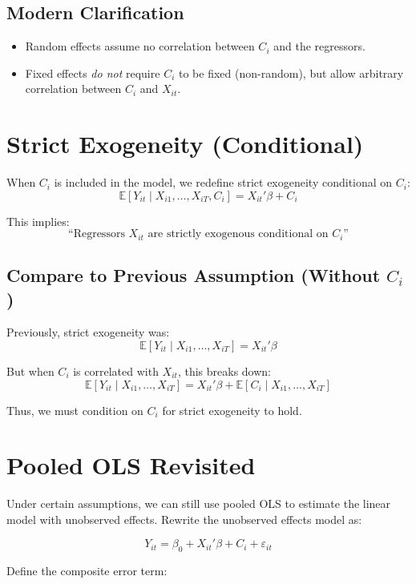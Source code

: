 \documentclass[12pt, oneside]{article}
\begin{document}
\subsection*{Modern Clarification}

\begin{itemize}
    \item Random effects assume no correlation between \( C_i \) and the regressors.
    \item Fixed effects \emph{do not} require \( C_i \) to be fixed (non-random), but allow arbitrary correlation between \( C_i \) and \( X_{it} \).
\end{itemize}

\section*{Strict Exogeneity (Conditional)}

When \( C_i \) is included in the model, we redefine strict exogeneity conditional on \( C_i \):
\[
\mathbb{E}[Y_{it} \mid X_{i1}, \dots, X_{iT}, C_i] = X_{it}' \beta + C_i
\]

This implies:
\[
\text{``Regressors } X_{it} \text{ are strictly exogenous conditional on } C_i\text{''}
\]

\subsection*{Compare to Previous Assumption (Without \( C_i \))}

Previously, strict exogeneity was:
\[
\mathbb{E}[Y_{it} \mid X_{i1}, \dots, X_{iT}] = X_{it}' \beta
\]

But when \( C_i \) is correlated with \( X_{it} \), this breaks down:
\[
\mathbb{E}[Y_{it} \mid X_{i1}, \dots, X_{iT}] = X_{it}' \beta + \mathbb{E}[C_i \mid X_{i1}, \dots, X_{iT}]
\]

Thus, we must condition on \( C_i \) for strict exogeneity to hold.

\section*{Pooled OLS Revisited}

Under certain assumptions, we can still use pooled OLS to estimate the linear model with unobserved effects. Rewrite the unobserved effects model as:

\[
Y_{it} = \beta_0 + X_{it}'\beta + C_i + \varepsilon_{it}
\]

Define the composite error term:
\end{document}
